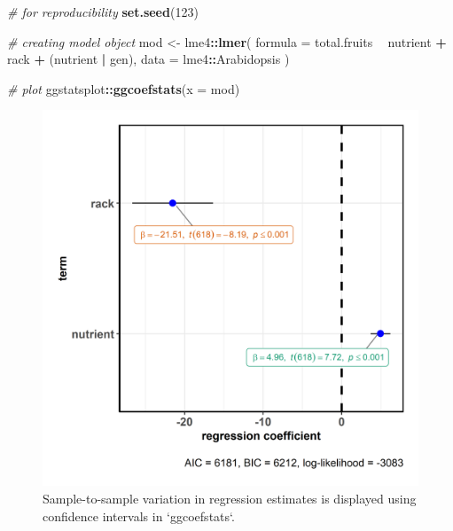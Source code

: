 \documentclass[]{article}
\newenvironment{Shaded}{\begin{snugshade}}{\end{snugshade}}
\newcommand{\CommentTok}[1]{\textcolor[rgb]{0.56,0.35,0.01}{\textit{#1}}}
\newcommand{\DataTypeTok}[1]{\textcolor[rgb]{0.13,0.29,0.53}{#1}}
\newcommand{\DecValTok}[1]{\textcolor[rgb]{0.00,0.00,0.81}{#1}}
\newcommand{\KeywordTok}[1]{\textcolor[rgb]{0.13,0.29,0.53}{\textbf{#1}}}
\newcommand{\NormalTok}[1]{#1}
\newcommand{\OperatorTok}[1]{\textcolor[rgb]{0.81,0.36,0.00}{\textbf{#1}}}
\newcommand{\StringTok}[1]{\textcolor[rgb]{0.31,0.60,0.02}{#1}}
\begin{document}
\begin{Shaded}
\begin{Highlighting}[]
\CommentTok{# for reproducibility}
\KeywordTok{set.seed}\NormalTok{(}\DecValTok{123}\NormalTok{)}

\CommentTok{# creating model object}
\NormalTok{mod <-}\StringTok{ }\NormalTok{lme4}\OperatorTok{::}\KeywordTok{lmer}\NormalTok{(}
  \DataTypeTok{formula =}\NormalTok{ total.fruits }\OperatorTok{~}\StringTok{ }\NormalTok{nutrient }\OperatorTok{+}\StringTok{ }\NormalTok{rack }\OperatorTok{+}\StringTok{ }\NormalTok{(nutrient }\OperatorTok{|}\StringTok{ }\NormalTok{gen),}
  \DataTypeTok{data =}\NormalTok{ lme4}\OperatorTok{::}\NormalTok{Arabidopsis}
\NormalTok{)}

\CommentTok{# plot}
\NormalTok{ggstatsplot}\OperatorTok{::}\KeywordTok{ggcoefstats}\NormalTok{(}\DataTypeTok{x =}\NormalTok{ mod)}
\end{Highlighting}
\end{Shaded}

\begin{figure}[H]
\includegraphics[width=1\linewidth]{./figures/paper-fig6-1} \caption{Sample-to-sample variation in regression estimates is displayed using confidence intervals in `ggcoefstats`.}\label{fig:fig6}
\end{figure}
\end{document}

